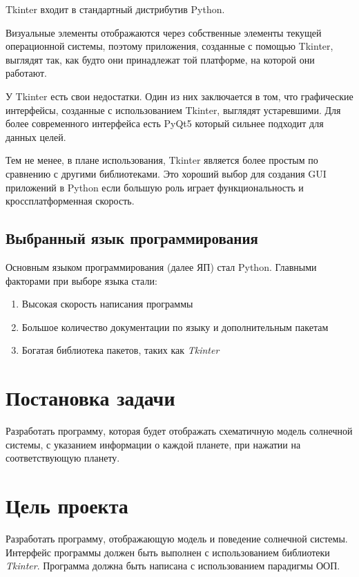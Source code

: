 \documentclass[11pt,a4paper]{report}
\begin{document}
Tkinter входит в стандартный дистрибутив Python.

Визуальные элементы отображаются через собственные элементы текущей операционной системы, поэтому приложения, созданные с помощью Tkinter, выглядят так, как будто они принадлежат той платформе, на которой они работают.

У Tkinter есть свои недостатки. Один из них заключается в том, что графические интерфейсы, созданные с использованием Tkinter, выглядят устаревшими. Для более современного интерфейса есть PyQt5 который сильнее подходит для данных целей.

Тем не менее, в плане использования, Tkinter является более простым по сравнению с другими библиотеками. Это хороший выбор для создания GUI приложений в Python если большую роль играет функциональность и кроссплатформенная скорость.

\subsection{Выбранный язык программирования}
Основным языком программирования (далее ЯП) стал Python. Главными факторами при выборе языка стали:
\begin{enumerate}
    \item Высокая скорость написания программы
    \item Большое количество документации по языку и дополнительным пакетам
    \item Богатая библиотека пакетов, таких как \textit{Tkinter} 
\end{enumerate} 
\section{Постановка задачи}
Разработать программу, которая  будет отображать схематичную модель солнечной системы, с указанием информации о каждой  планете, при нажатии на соответствующую планету. 

\section{Цель проекта}
Разработать программу, отображающую модель и поведение солнечной системы. Интерфейс программы должен быть выполнен с использованием библиотеки \textit{Tkinter}. Программа должна быть написана с использованием парадигмы ООП.
\end{document}
